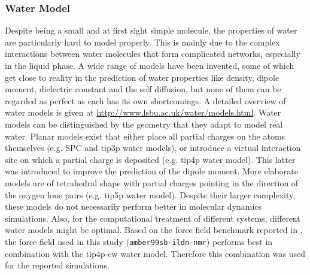 \documentclass[english, a4paper, 12pt, titlepage, draft]{article}
\begin{document}

\subsubsection{Water Model}

Despite being a small and at first sight simple molecule, the properties of water are particularly hard to model properly.
This is mainly due to the complex interactions between water molecules that form complicated networks, especially in the liquid phase.
A wide range of models have been invented, some of which get close to reality in the prediction of water properties like density, dipole moment, dielectric constant and the self diffusion, but none of them can be regarded as perfect as each has its own shortcomings.
A detailed overview of water models is given at \url{http://www.lsbu.ac.uk/water/models.html}.
Water models can be distinguished by the geometry that they adapt to model real water.
Planar models exist that either place all partial charges on the atoms themselves (e.g. SPC and tip3p water models), or introduce a virtual interaction site on which a partial charge is deposited (e.g. tip4p water model).
This latter was introduced to improve the prediction of the dipole moment.
More elaborate models are of tetrahedral shape with partial charges pointing in the direction of the oxygen lone pairs (e.g. tip5p water model).
Despite their larger complexity, these models do not necessarily perform better in molecular dynamics simulations.
Also, for the computational treatment of different systems, different water models might be optimal.
Based on the force field benchmark reported in \cite{proteinFF}, the force field used in this study (\texttt{amber99sb-ildn-nmr}) performs best in combination with the tip4p-ew water model.
Therefore this combination was used for the reported simulations.





%
%
 
\end{document}

